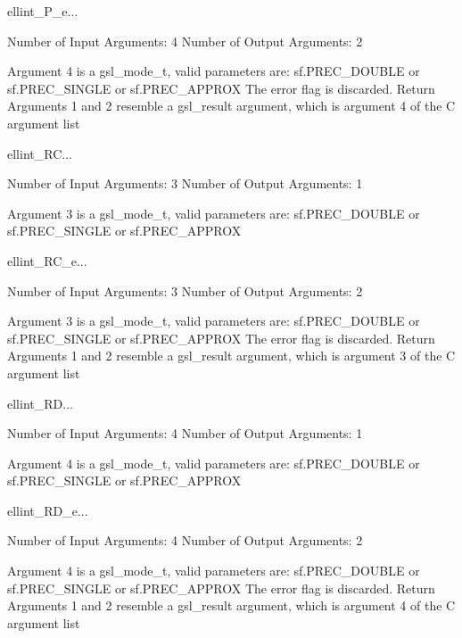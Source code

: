 \begin{funcdesc}{ellint_P_e}{...}

    Number of Input  Arguments:  4
    Number of Output Arguments:  2

 Argument 4 is a gsl_mode_t, valid parameters are:
	sf.PREC_DOUBLE or sf.PREC_SINGLE or sf.PREC_APPROX
The error flag is discarded.
Return Arguments 1 and 2 resemble a gsl_result argument,
	which is  argument 4 of the C argument list

\end{funcdesc}

\begin{funcdesc}{ellint_RC}{...}

    Number of Input  Arguments:  3
    Number of Output Arguments:  1

 Argument 3 is a gsl_mode_t, valid parameters are:
	sf.PREC_DOUBLE or sf.PREC_SINGLE or sf.PREC_APPROX

\end{funcdesc}

\begin{funcdesc}{ellint_RC_e}{...}

    Number of Input  Arguments:  3
    Number of Output Arguments:  2

 Argument 3 is a gsl_mode_t, valid parameters are:
	sf.PREC_DOUBLE or sf.PREC_SINGLE or sf.PREC_APPROX
The error flag is discarded.
Return Arguments 1 and 2 resemble a gsl_result argument,
	which is  argument 3 of the C argument list

\end{funcdesc}

\begin{funcdesc}{ellint_RD}{...}

    Number of Input  Arguments:  4
    Number of Output Arguments:  1

 Argument 4 is a gsl_mode_t, valid parameters are:
	sf.PREC_DOUBLE or sf.PREC_SINGLE or sf.PREC_APPROX

\end{funcdesc}

\begin{funcdesc}{ellint_RD_e}{...}

    Number of Input  Arguments:  4
    Number of Output Arguments:  2

 Argument 4 is a gsl_mode_t, valid parameters are:
	sf.PREC_DOUBLE or sf.PREC_SINGLE or sf.PREC_APPROX
The error flag is discarded.
Return Arguments 1 and 2 resemble a gsl_result argument,
	which is  argument 4 of the C argument list

\end{funcdesc}

